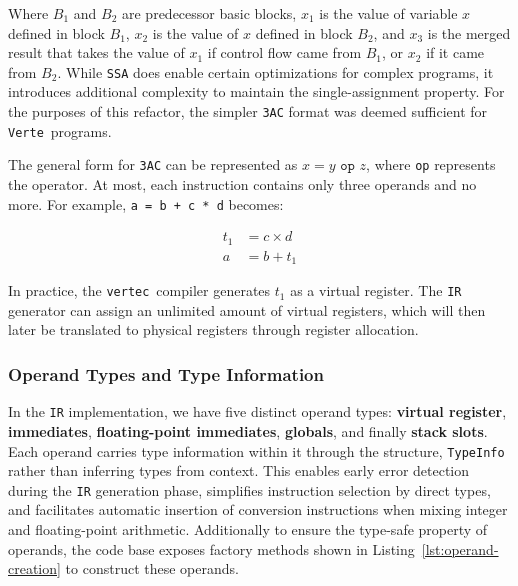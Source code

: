\documentclass[11pt]{article}
\newcommand{\code}[1]{\texttt{#1}}
\newcommand{\constant}[1]{\texttt{#1}}
\newcommand{\verte}{\texttt{Verte}}
\newcommand{\vertec}{\texttt{vertec}}
\newcommand{\lstref}[1]{Listing~\ref{#1}}
\begin{document}
Where $B_1$ and $B_2$ are predecessor basic blocks, $x_1$ is the value of variable $x$ defined in block $B_1$, $x_2$ is the value of $x$ defined in block $B_2$, and $x_3$ is the merged result that takes the value of $x_1$ if control flow came from $B_1$, or $x_2$ if it came from $B_2$. While \constant{SSA} does enable certain optimizations for complex programs, it introduces additional complexity to maintain the single-assignment property. For the purposes of this refactor, the simpler \constant{3AC} format was deemed sufficient for \verte\ programs.

\newpage

The general form for \constant{3AC} can be represented as $x = y \texttt{ op } z$, where \texttt{op} represents the operator. At most, each instruction contains only three operands and no more. For example, \code{a = b + c * d} becomes:

\begin{eq}[!ht]
	\begin{equation}
		\label{eq:three-address-example}
		\begin{aligned}
			t_1 & = c \times d \\
			a   & = b + t_1
		\end{aligned}
	\end{equation}
	\caption*{Equation 2: Three-Address Code Example}
\end{eq}

In practice, the \vertec\ compiler generates $t_1$ as a virtual register. The \constant{IR} generator can assign an unlimited amount of virtual registers, which will then later be translated to physical registers through register allocation.

\subsubsection{Operand Types and Type Information}

In the \constant{IR} implementation, we have five distinct operand types: \textbf{virtual register}, \textbf{immediates}, \textbf{floating-point immediates}, \textbf{globals}, and finally \textbf{stack slots}. Each operand carries type information within it through the structure, \code{TypeInfo} rather than inferring types from context. This enables early error detection during the \constant{IR} generation phase, simplifies instruction selection by direct types, and facilitates automatic insertion of conversion instructions when mixing integer and floating-point arithmetic. Additionally to ensure the type-safe property of operands, the code base exposes factory methods shown in \lstref{lst:operand-creation} to construct these operands.
\end{document}
